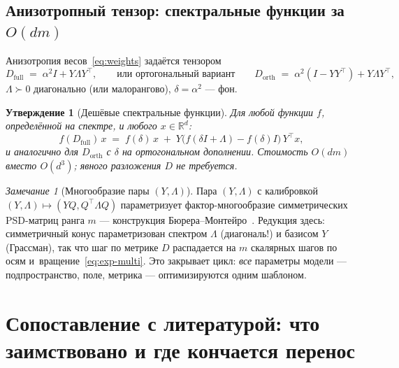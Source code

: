 \documentclass[11pt,a4paper]{article}
\newcommand{\R}{\mathbb{R}}
\newcommand{\Id}{I}
\newcommand{\T}{^{\!\top}}
\theoremstyle{plain}
\newtheorem{prop}[theorem]{Утверждение}
\theoremstyle{definition}
\theoremstyle{remark}
\newtheorem{remark}[theorem]{Замечание}
\begin{document}
\subsection{Анизотропный тензор: спектральные функции за $O(dm)$}

Анизотропия весов~\eqref{eq:weights} задаётся тензором
\begin{equation}\label{eq:dfull}
D_{\mathrm{full}}\;=\;\alpha^2\Id+Y\Lambda Y\T,
\qquad\text{или ортогональный вариант}\qquad
D_{\mathrm{orth}}\;=\;\alpha^2(\Id-YY\T)+Y\Lambda Y\T,
\end{equation}
$\Lambda\succ0$ диагонально (или малорангово), $\delta=\alpha^2$ --- фон.

\begin{prop}[Дешёвые спектральные функции]\label{prop:spfun}
Для любой функции $f$, определённой на спектре, и любого $x\in\R^d$:
\begin{equation}\label{eq:spfun}
f(D_{\mathrm{full}})\,x\;=\;f(\delta)\,x\;+\;Y\bigl(f(\delta\Id+\Lambda)-f(\delta)\Id\bigr)\,Y\T x,
\end{equation}
и аналогично для $D_{\mathrm{orth}}$ с $\delta$ на ортогональном дополнении.
Стоимость $O(dm)$ вместо $O(d^3)$; явного разложения $D$ не требуется.
\end{prop}

\begin{remark}[Многообразие пары $(Y,\Lambda)$]
Пара $(Y,\Lambda)$ с калибровкой $(Y,\Lambda)\mapsto(YQ,Q\T\Lambda Q)$
параметризует фактор-многообразие симметрических PSD-матриц ранга $m$
--- конструкция Бюрера--Монтейро~\cite{journee-2010}. Редукция здесь:
симметричный конус параметризован спектром $\Lambda$ (диагональ!) и
базисом $Y$ (Грассман), так что шаг по метрике $D$ распадается на
$m$ скалярных шагов по осям и~вращение~\eqref{eq:exp-multi}. Это
закрывает цикл: \emph{все} параметры модели --- подпространство, поле,
метрика --- оптимизируются одним шаблоном.
\end{remark}

\section{Сопоставление с литературой: что заимствовано и где кончается перенос}\label{sec:lit}
\end{document}
